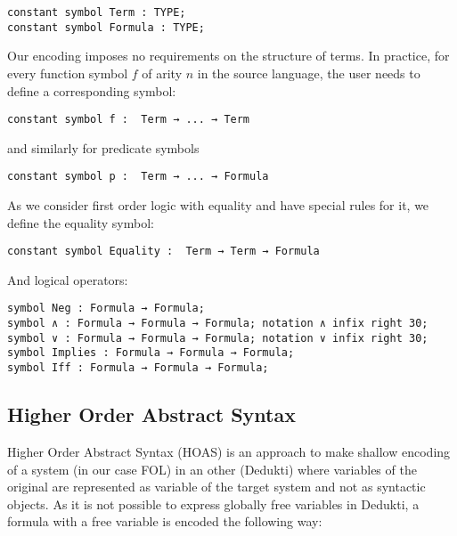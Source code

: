 \documentclass{article}
\begin{document}
	\begin{lstlisting}[language=Dialekto]
constant symbol Term : TYPE;
constant symbol Formula : TYPE;
	\end{lstlisting}
	Our encoding imposes no requirements on the structure of terms. In practice,  for every function symbol $f$ of arity $n$ in the source language, the user needs to define a corresponding symbol:
	\begin{lstlisting}[language=Dialekto]
constant symbol f :  Term → ... → Term
	\end{lstlisting}
	and similarly for predicate symbols
	\begin{lstlisting}[language=Dialekto]
constant symbol p :  Term → ... → Formula
	\end{lstlisting}
	As we consider first order logic with equality and have special rules for it, we define the equality symbol:
	\begin{lstlisting}[language=Dialekto]
constant symbol Equality :  Term → Term → Formula
	\end{lstlisting}
	And logical operators:
	\begin{lstlisting}[language=Dialekto]
symbol Neg : Formula → Formula;
symbol ∧ : Formula → Formula → Formula; notation ∧ infix right 30;
symbol ∨ : Formula → Formula → Formula; notation ∨ infix right 30;
symbol Implies : Formula → Formula → Formula;
symbol Iff : Formula → Formula → Formula;
\end{lstlisting}
	\subsection{Higher Order Abstract Syntax}
	Higher Order Abstract Syntax (HOAS) is an approach to make shallow encoding of a system (in our case FOL) in an other (Dedukti) where variables of the original are represented as variable of the target system and not as syntactic objects. As it is not possible to express globally free variables in Dedukti, a formula with a free variable is encoded the following way:
	
\end{document}
